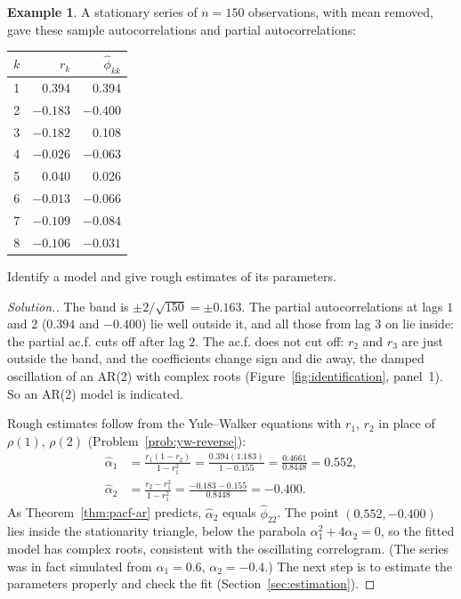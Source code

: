 \documentclass[11pt,a4paper]{article}
\theoremstyle{definition}
\newtheorem{exa}[thm]{Example}
\newenvironment{solution}
  {\renewcommand{\qedsymbol}{}\begin{proof}[\textit{Solution}.]}
  {\end{proof}}
\begin{document}
\begin{exa}\label{exa:identify}
A stationary series of $n = 150$ observations, with mean removed, gave these sample autocorrelations and partial
autocorrelations:
\begin{center}
\begin{tabular}{crr}
$k$ & $r_k$ & $\hat\phi_{kk}$ \\
\hline
1 & 0.394 & 0.394 \\
2 & $-0.183$ & $-0.400$ \\
3 & $-0.182$ & 0.108 \\
4 & $-0.026$ & $-0.063$ \\
5 & 0.040 & 0.026 \\
6 & $-0.013$ & $-0.066$ \\
7 & $-0.109$ & $-0.084$ \\
8 & $-0.106$ & $-0.031$ \\
\end{tabular}
\end{center}
Identify a model and give rough estimates of its parameters.
\end{exa}

\begin{solution}
The band is $\pm2/\sqrt{150} = \pm0.163$. The partial autocorrelations at lags $1$ and $2$ ($0.394$ and $-0.400$) lie well outside it, and all
those from lag $3$ on lie inside: the partial ac.f. cuts off after lag $2$. The ac.f. does not cut off: $r_2$ and $r_3$ are just outside the band,
and the coefficients change sign and die away, the damped oscillation of an AR(2) with complex roots
(Figure~\ref{fig:identification}, panel~1). So an AR(2) model is indicated.

Rough estimates follow from the Yule--Walker equations with $r_1$, $r_2$ in place of $\rho(1)$, $\rho(2)$ (Problem~\ref{prob:yw-reverse}):
\begin{align*}
\hat\alpha_1 &= \frac{r_1(1 - r_2)}{1 - r_1^2} = \frac{0.394(1.183)}{1 - 0.155} = \frac{0.4661}{0.8448} = 0.552 , \\
\hat\alpha_2 &= \frac{r_2 - r_1^2}{1 - r_1^2} = \frac{-0.183 - 0.155}{0.8448} = -0.400 .
\end{align*}
As Theorem~\ref{thm:pacf-ar} predicts, $\hat\alpha_2$ equals $\hat\phi_{22}$. The point $(0.552, -0.400)$ lies inside the stationarity triangle, below the
parabola $\alpha_1^2 + 4\alpha_2 = 0$, so the fitted model has complex roots, consistent with the oscillating correlogram. (The series
was in fact simulated from $\alpha_1 = 0.6$, $\alpha_2 = -0.4$.) The next step is to estimate the parameters properly and check the fit
(Section~\ref{sec:estimation}).
\end{solution}
\end{document}
